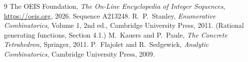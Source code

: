 \documentclass[11pt,a4paper]{article}
\theoremstyle{plain}
\theoremstyle{definition}
\begin{document}
\begin{thebibliography}{9}
 The OEIS Foundation, \emph{The On-Line Encyclopedia of Integer
Sequences}, \url{https://oeis.org}, 2026. Sequence A213248.
 R.~P.~Stanley, \emph{Enumerative Combinatorics}, Volume 1, 2nd ed.,
Cambridge University Press, 2011. (Rational generating functions, Section 4.1.)
 M.~Kauers and P.~Paule, \emph{The Concrete Tetrahedron}, Springer, 2011.
 P.~Flajolet and R.~Sedgewick, \emph{Analytic Combinatorics}, Cambridge
University Press, 2009.
\end{thebibliography}
\end{document}
